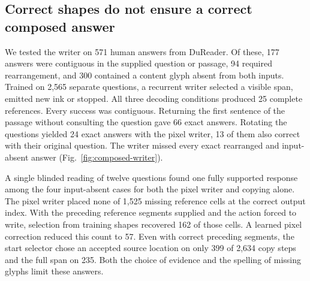 \subsection*{Correct shapes do not ensure a correct composed answer}
We tested the writer on 571 human answers from DuReader. Of these, 177 answers were contiguous in the supplied question or passage, 94 required rearrangement, and 300 contained a content glyph absent from both inputs. Trained on 2,565 separate questions, a recurrent writer selected a visible span, emitted new ink or stopped. All three decoding conditions produced 25 complete references. Every success was contiguous. Returning the first sentence of the passage without consulting the question gave 66 exact answers. Rotating the questions yielded 24 exact answers with the pixel writer, 13 of them also correct with their original question. The writer missed every exact rearranged and input-absent answer (Fig.~\ref{fig:composed-writer}).

A single blinded reading of twelve questions found one fully supported response among the four input-absent cases for both the pixel writer and copying alone. The pixel writer placed none of 1,525 missing reference cells at the correct output index. With the preceding reference segments supplied and the action forced to write, selection from training shapes recovered 162 of those cells. A learned pixel correction reduced this count to 57. Even with correct preceding segments, the start selector chose an accepted source location on only 399 of 2,634 copy steps and the full span on 235. Both the choice of evidence and the spelling of missing glyphs limit these answers.
